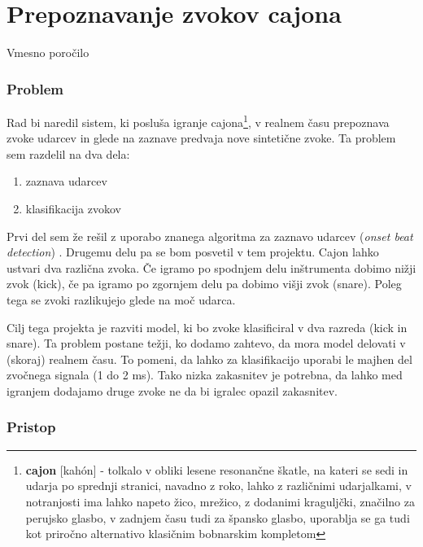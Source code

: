 \documentclass[11pt,a4paper]{article}
\begin{document}
\part*{Prepoznavanje zvokov cajona}
{\Large Vmesno poročilo}

\section{Problem}
Rad bi naredil sistem, ki posluša igranje cajona\footnote{\textbf{cajon} [kahón] - tolkalo v obliki lesene resonančne škatle, na kateri se sedi in udarja po sprednji stranici, navadno z roko, lahko z različnimi udarjalkami, v notranjosti ima lahko napeto žico, mrežico, z dodanimi kraguljčki, značilno za perujsko glasbo, v zadnjem času tudi za špansko glasbo, uporablja se ga tudi kot priročno alternativo klasičnim bobnarskim kompletom}, v realnem času prepoznava zvoke udarcev in glede na zaznave predvaja nove sintetične zvoke. Ta problem sem razdelil na dva dela:
\begin{enumerate}
    \item zaznava udarcev
    \item klasifikacija zvokov
\end{enumerate}

Prvi del sem že rešil z uporabo znanega algoritma za zaznavo udarcev (\emph{onset beat detection}) \cite{OnSetTemporal2004,OnSet2001}. Drugemu delu pa se bom posvetil v tem projektu. Cajon lahko ustvari dva različna zvoka. Če igramo po spodnjem delu inštrumenta dobimo nižji zvok (kick), če pa igramo po zgornjem delu pa dobimo višji zvok (snare). Poleg tega se zvoki razlikujejo glede na moč udarca. 

Cilj tega projekta je razviti model, ki bo zvoke klasificiral v dva razreda (kick in snare). Ta problem postane težji, ko dodamo zahtevo, da mora model delovati v (skoraj) realnem času. To pomeni, da lahko za klasifikacijo uporabi le majhen del zvočnega signala (1 do 2 ms). Tako nizka zakasnitev je potrebna, da lahko med igranjem dodajamo druge zvoke ne da bi igralec opazil zakasnitev.

\section{Pristop}
\end{document}
